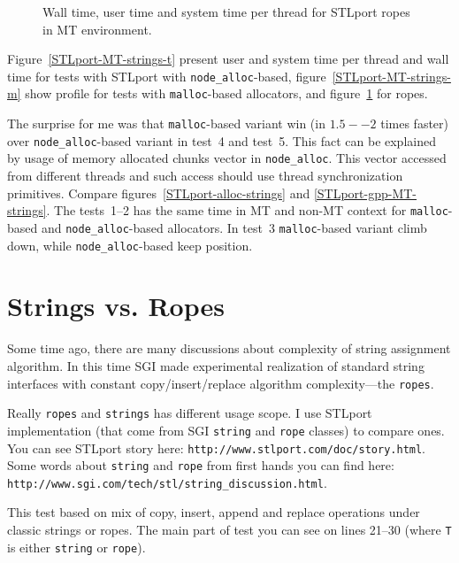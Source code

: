 \documentclass[a4paper]{article}
\providecommand{\STLport}{{\fontfamily{cmss}\selectfont STLport}}
\begin{document}
\begin{figure}
  \begin{center}
    
  \end{center}
  \caption{
           Wall time, user time and system time per thread for 
           \STLport{} ropes in MT environment.
           \label{STLport-MT-strings-r}}
\end{figure}

Figure~\ref{STLport-MT-strings-t} present user and system time per thread
and wall time for tests with STLport with
\texttt{node\_alloc}-based,
figure~\ref{STLport-MT-strings-m} show profile for tests with \texttt{malloc}-based allocators, and figure~\ref{STLport-MT-strings-r} for ropes.

The surprise for me was that \texttt{malloc}-based variant
win (in $1.5--2$ times faster) over \texttt{node\_alloc}-based variant in test~4
and test~5.
This fact can be explained by usage of memory allocated chunks vector
in \texttt{node\_alloc}. This vector accessed from different threads
and such access should use thread synchronization primitives.
Compare figures~\ref{STLport-alloc-strings} and \ref{STLport-gpp-MT-strings}.
The tests~1--2 has the same time in MT and non-MT context for
\texttt{malloc}-based and \texttt{node\_alloc}-based allocators.
In test~3 \texttt{malloc}-based variant climb down, while
\texttt{node\_alloc}-based keep position. 

\section{Strings vs. Ropes}

Some time ago, there are many discussions about complexity
of string assignment algorithm.
In this time 
SGI made experimental realization of standard string interfaces
with constant copy/insert/replace algorithm complexity---the \texttt{ropes}.

Really \texttt{ropes} and \texttt{strings} has different usage scope.
I use STLport implementation (that come from SGI \texttt{string} and \texttt{rope}
classes) to compare ones. You can see STLport story here:
\texttt{http://www.stlport.com/doc/story.html}.
Some words about \texttt{string} and \texttt{rope}
from first hands you can find here:\\
\texttt{http://www.sgi.com/tech/stl/string\_discussion.html}.

This test based on mix of copy, insert, append and replace
operations under classic strings or ropes. The main part
of test you can see on lines 21--30 (where \texttt{T} is
either \texttt{string} or \texttt{rope}).
\end{document}
